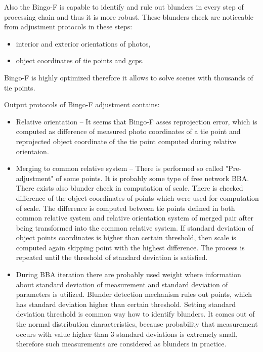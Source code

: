 \documentclass[a4paper,12pt]{article}
\begin{document}
Also the Bingo-F is capable to identify and rule out blunders in every step of processing chain and thus it is more robust.
These blunders check are noticeable from adjustment protocols in these steps:
\begin{itemize}
\item interior and exterior orientations of photos,
\item object coordinates of tie points and gcps.
\end{itemize}



Bingo-F is highly optimized therefore it allows to solve scenes with thousands of tie points.

Output  protocols of Bingo-F adjustment contains: 
\begin{itemize}
\item Relative orientation -- It seems that Bingo-F asses reprojection error, which is computed 
as difference of measured photo coordinates of a tie point and reprojected object coordinate of the tie point computed during relative orientaion.
\item Merging to common relative system -- There is performed so called "Pre-adjustment" of some points. It is probably some type of free network 
BBA. There exists also blunder check in computation of scale. There is checked difference of the object coordinates of points 
which were used for computation of scale. The difference is computed between tie points defined in both common relative system 
and relative orientation system of merged pair after being transformed into the common relative system.
If standard deviation of object points coordinates is higher than certain threshold, then 
scale is computed again skipping point with the highest difference.
The process is repeated  until  the threshold of standard deviation is satisfied.  
\item During BBA iteration there are probably used weight where information about standard deviation of measurement 
and standard deviation of parameters is utilized. Blunder detection mechanism rules out points, which 
has standard deviation higher than certain threshold. Setting standard deviation threshold  is common way how to identify 
blunders. It comes out of the normal distribution characteristics, because probability that measurement occurs with value 
 higher than 3 standard deviations is extremely small, therefore such measurements are considered as blunders in practice.
\end{itemize}
\end{document}
